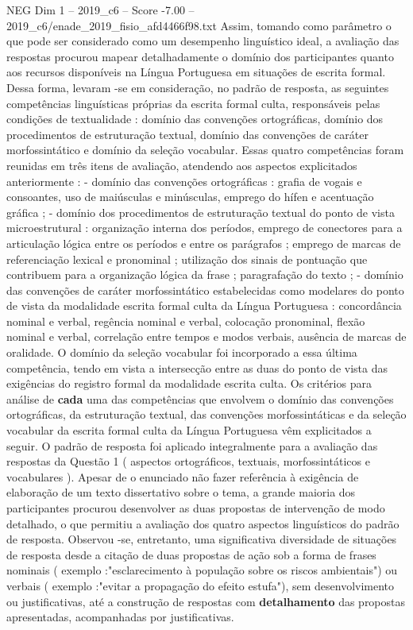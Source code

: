 \begin{textsample}{NEG Dim 1 – 2019\_c6 – Score -7.00 – 2019\_c6/enade\_2019\_fisio\_afd4466f98.txt}
Assim, tomando como parâmetro o que pode ser considerado como um desempenho linguístico ideal, a avaliação das respostas procurou mapear detalhadamente o domínio dos participantes quanto aos recursos disponíveis na Língua Portuguesa em situações de escrita formal.
Dessa forma, levaram -se em consideração, no padrão de resposta, as seguintes competências linguísticas próprias da escrita formal culta, responsáveis pelas condições de textualidade : domínio das convenções ortográficas, domínio dos procedimentos de estruturação textual, domínio das convenções de caráter morfossintático e domínio da seleção vocabular.
Essas quatro competências foram reunidas em três itens de avaliação, atendendo aos aspectos explicitados anteriormente : - domínio das convenções ortográficas : grafia de vogais e consoantes, uso de maiúsculas e minúsculas, emprego do hífen e acentuação gráfica ; - domínio dos procedimentos de estruturação textual do ponto de vista microestrutural : organização interna dos períodos, emprego de conectores para a articulação lógica entre os períodos e entre os parágrafos ; emprego de marcas de referenciação lexical e pronominal ; utilização dos sinais de pontuação que contribuem para a organização lógica da frase ; paragrafação do texto ; - domínio das convenções de caráter morfossintático estabelecidas como modelares do ponto de vista da modalidade escrita formal culta da Língua Portuguesa : concordância nominal e verbal, regência nominal e verbal, colocação pronominal, flexão nominal e verbal, correlação entre tempos e modos verbais, ausência de marcas de oralidade.
O domínio da seleção vocabular foi incorporado a essa última competência, tendo em vista a intersecção entre as duas do ponto de vista das exigências do registro formal da modalidade escrita culta.
Os critérios para análise de \textbf{cada} uma das competências que envolvem o domínio das convenções ortográficas, da estruturação textual, das convenções morfossintáticas e da seleção vocabular da escrita formal culta da Língua Portuguesa vêm explicitados a seguir.
O padrão de resposta foi aplicado integralmente para a avaliação das respostas da Questão 1 ( aspectos ortográficos, textuais, morfossintáticos e vocabulares ).
Apesar de o enunciado não fazer referência à exigência de elaboração de um texto dissertativo sobre o tema, a grande maioria dos participantes procurou desenvolver as duas propostas de intervenção de modo detalhado, o que permitiu a avaliação dos quatro aspectos linguísticos do padrão de resposta.
Observou -se, entretanto, uma significativa diversidade de situações de resposta desde a citação de duas propostas de ação sob a forma de frases nominais ( exemplo :"esclarecimento à população sobre os riscos ambientais") ou verbais ( exemplo :"evitar a propagação do efeito estufa"), sem desenvolvimento ou justificativas, até a construção de respostas com \textbf{detalhamento} das propostas apresentadas, acompanhadas por justificativas.

\end{textsample}
